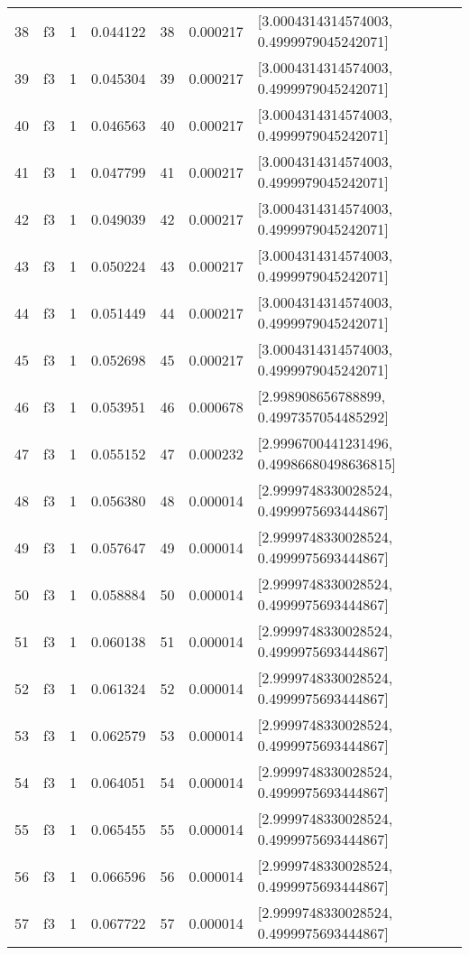 \begin{tabular}{lllrlrl}
38  &  f3 &   1 &  0.044122 &   38 &  0.000217 &   [3.0004314314574003, 0.4999979045242071] \\
39  &  f3 &   1 &  0.045304 &   39 &  0.000217 &   [3.0004314314574003, 0.4999979045242071] \\
40  &  f3 &   1 &  0.046563 &   40 &  0.000217 &   [3.0004314314574003, 0.4999979045242071] \\
41  &  f3 &   1 &  0.047799 &   41 &  0.000217 &   [3.0004314314574003, 0.4999979045242071] \\
42  &  f3 &   1 &  0.049039 &   42 &  0.000217 &   [3.0004314314574003, 0.4999979045242071] \\
43  &  f3 &   1 &  0.050224 &   43 &  0.000217 &   [3.0004314314574003, 0.4999979045242071] \\
44  &  f3 &   1 &  0.051449 &   44 &  0.000217 &   [3.0004314314574003, 0.4999979045242071] \\
45  &  f3 &   1 &  0.052698 &   45 &  0.000217 &   [3.0004314314574003, 0.4999979045242071] \\
46  &  f3 &   1 &  0.053951 &   46 &  0.000678 &    [2.998908656788899, 0.4997357054485292] \\
47  &  f3 &   1 &  0.055152 &   47 &  0.000232 &  [2.9996700441231496, 0.49986680498636815] \\
48  &  f3 &   1 &  0.056380 &   48 &  0.000014 &   [2.9999748330028524, 0.4999975693444867] \\
49  &  f3 &   1 &  0.057647 &   49 &  0.000014 &   [2.9999748330028524, 0.4999975693444867] \\
50  &  f3 &   1 &  0.058884 &   50 &  0.000014 &   [2.9999748330028524, 0.4999975693444867] \\
51  &  f3 &   1 &  0.060138 &   51 &  0.000014 &   [2.9999748330028524, 0.4999975693444867] \\
52  &  f3 &   1 &  0.061324 &   52 &  0.000014 &   [2.9999748330028524, 0.4999975693444867] \\
53  &  f3 &   1 &  0.062579 &   53 &  0.000014 &   [2.9999748330028524, 0.4999975693444867] \\
54  &  f3 &   1 &  0.064051 &   54 &  0.000014 &   [2.9999748330028524, 0.4999975693444867] \\
55  &  f3 &   1 &  0.065455 &   55 &  0.000014 &   [2.9999748330028524, 0.4999975693444867] \\
56  &  f3 &   1 &  0.066596 &   56 &  0.000014 &   [2.9999748330028524, 0.4999975693444867] \\
57  &  f3 &   1 &  0.067722 &   57 &  0.000014 &   [2.9999748330028524, 0.4999975693444867] \\

\end{tabular}
